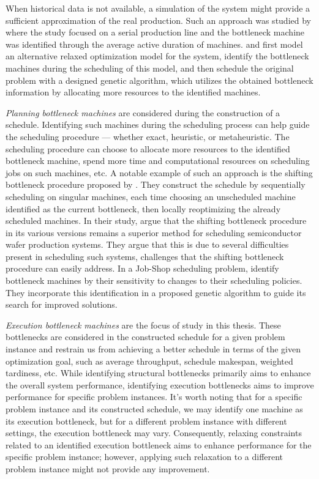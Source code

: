 When historical data is not available,
a simulation of the system might provide a sufficient approximation of the real production.
Such an approach was studied by \citet{Roser2001} where the study focused on a serial production line
and the bottleneck machine was identified through the average active duration of machines.
\citet{Zhang2008a} and \citet{Zhang2012} first model an alternative relaxed optimization model for the system,
identify the bottleneck machines during the scheduling of this model,
and then schedule the original problem with a designed genetic algorithm,
which utilizes the obtained bottleneck information by allocating more resources to the identified machines.

\emph{Planning bottleneck machines} are considered during the construction of a schedule.
Identifying such machines during the scheduling process can help guide the scheduling procedure
--- whether exact, heuristic, or metaheuristic.
The scheduling procedure can choose to allocate more resources to the identified bottleneck machine,
spend more time and computational resources on scheduling jobs on such machines, etc.
A notable example of such an approach is the shifting bottleneck procedure proposed by \citet{Adams1988}.
They construct the schedule by sequentially scheduling on singular machines,
each time choosing an unscheduled machine identified as the current bottleneck,
then locally reoptimizing the already scheduled machines.
In their study, \citet{Mnch2010} argue that the shifting bottleneck procedure in its various versions
remains a superior method for scheduling semiconductor wafer production systems.
They argue that this is due to several difficulties present in scheduling such systems,
challenges that the shifting bottleneck procedure can easily address.
In a Job-Shop scheduling problem,
\citet{Zhang2008b} identify bottleneck machines by their sensitivity to changes to their scheduling policies.
They incorporate this identification in a proposed genetic algorithm to guide its search for improved solutions.

\emph{Execution bottleneck machines} are the focus of study in this thesis.
These bottlenecks are considered in the constructed schedule for a given problem instance
and restrain us from achieving a better schedule in terms of the given optimization goal,
such as average throughput, schedule makespan, weighted tardiness, etc.
While identifying structural bottlenecks primarily aims to enhance the overall system performance,
identifying execution bottlenecks aims to improve performance for specific problem instances.
It's worth noting that for a specific problem instance and its constructed schedule,
we may identify one machine as its execution bottleneck,
but for a different problem instance with different settings,
the execution bottleneck may vary.
Consequently, relaxing constraints related to an identified execution bottleneck
aims to enhance performance for the specific problem instance;
however, applying such relaxation to a different problem instance might not provide any improvement.


